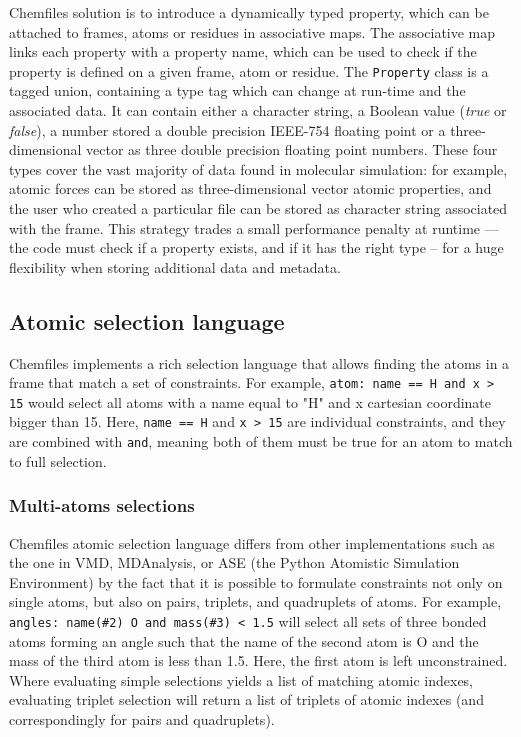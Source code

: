 \documentclass[thesis]{subfiles}
\begin{document}
Chemfiles solution is to introduce a dynamically typed property, which can be
attached to frames, atoms or residues in associative maps. The associative map
links each property with a property name, which can be used to check if the
property is defined on a given frame, atom or residue. The \texttt{Property}
class is a tagged union, containing a type tag which can change at run-time and
the associated data. It can contain either a character string, a Boolean value
(\emph{true} or \emph{false}), a number stored a double precision IEEE-754
floating point or a three-dimensional vector as three double precision floating
point numbers. These four types cover the vast majority of data found in
molecular simulation: for example, atomic forces can be stored as
three-dimensional vector atomic properties, and the user who created a
particular file can be stored as character string associated with the frame.
This strategy trades a small performance penalty at runtime --- the code must
check if a property exists, and if it has the right type -- for a huge
flexibility when storing additional data and metadata.

\subsection{Atomic selection language}
\label{sec:chemfiles:selections}
\newcommand{\token}[1]{\texttt{\bfseries#1}}

Chemfiles implements a rich selection language that allows finding the atoms in a
frame that match a set of constraints. For example, \texttt{atom: name == H and x
> 15} would select all atoms with a name equal to "H" and x cartesian coordinate
bigger than 15. Here, \texttt{name == H} and \texttt{x > 15} are individual
constraints, and they are combined with \texttt{and}, meaning both of them must
be true for an atom to match to full selection.

\subsubsection{Multi-atoms selections}

Chemfiles atomic selection language differs from other implementations such as
the one in VMD, MDAnalysis, or ASE (the Python Atomistic Simulation Environment)
by the fact that it is possible to formulate constraints not only on single
atoms, but also on pairs, triplets, and quadruplets of atoms. For example,
\texttt{angles: name(\#2) O and mass(\#3) < 1.5} will select all sets of three
bonded atoms forming an angle such that the name of the second atom is O and the
mass of the third atom is less than 1.5. Here, the first atom is left
unconstrained. Where evaluating simple selections yields a list of matching
atomic indexes, evaluating triplet selection will return a list of triplets of
atomic indexes (and correspondingly for pairs and quadruplets).
\end{document}

